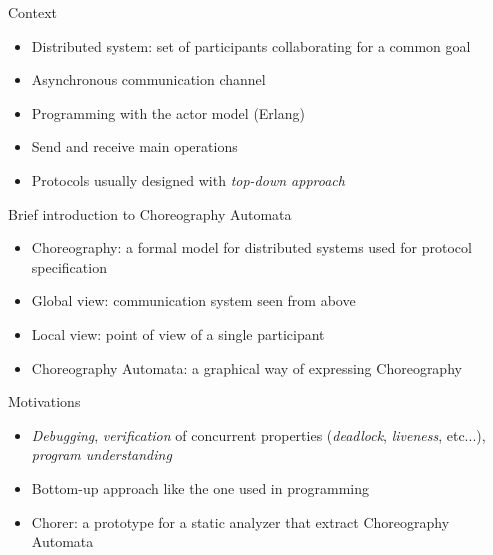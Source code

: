 \documentclass{beamer}
\begin{document}
\begin{frame}{Context}
\begin{itemize}
    \item Distributed system: set of participants collaborating for a  
    common goal
    \bigskip
    \item Asynchronous communication channel
    \bigskip
    \item Programming with the actor model (Erlang)
    \bigskip
    \item Send and receive main operations
    \bigskip
    \item Protocols usually designed with \textit{top-down approach} 
\end{itemize}
    
\end{frame}

\begin{frame}{Brief introduction to Choreography Automata}

\begin{itemize}
    \item Choreography: a formal model for distributed systems used
    for protocol specification
    \bigskip
    \item Global view: communication system seen from above
    \bigskip
    \item Local view: point of view of a single participant
    \bigskip
    \item Choreography Automata: a graphical way of expressing Choreography
\end{itemize}
\end{frame}

\begin{frame}{Motivations}
\begin{itemize}
    \item \textit{Debugging}, \textit{verification} of 
    concurrent properties (\textit{deadlock}, \textit{liveness}, etc...), 
    \textit{program understanding}
    \bigskip
    \item Bottom-up approach like the one used in programming
    \bigskip
    \item Chorer: a prototype for a static analyzer that extract Choreography Automata
\end{itemize}
\end{frame}
\end{document}
